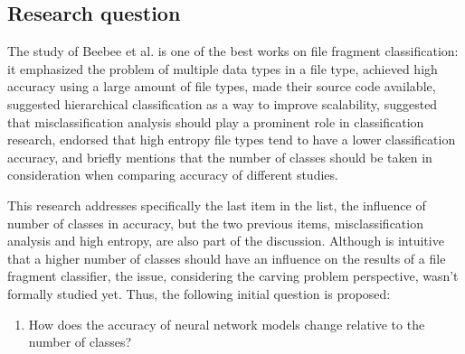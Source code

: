 \subsection{Research question}

The study of Beebee et al. \cite{beebe_sceadan:_2013} is one of the best works on file fragment classification: it emphasized the problem of multiple data types in a file type, achieved high accuracy using a large amount of file types, made their source code available, suggested hierarchical classification as a way to improve scalability, suggested that misclassification analysis should play a prominent role in classification research, endorsed that high entropy file types tend to have a lower classification accuracy, and briefly mentions that the number of classes should be taken in consideration when comparing accuracy of different studies.

This research addresses specifically the last item in the list, the influence of number of classes in accuracy, but the two previous items, misclassification analysis and high entropy, are also part of the discussion. Although is intuitive that a higher number of classes should have an influence on the results of a file fragment classifier, the issue, considering the carving problem perspective, wasn't formally studied yet. Thus, the following initial question is proposed:

\begin{enumerate}[itemindent=\parindent,label=\textbf{Q\arabic*.}]

    \item How does the accuracy of neural network models change relative to the number of classes?

\end{enumerate}


